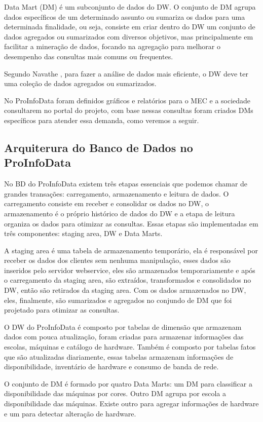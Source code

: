 \documentclass[a4paper,12pt]{article}
\begin{document}
Data Mart (DM) é um subconjunto de dados do DW. O conjunto de DM agrupa dados
específicos de um determinado assunto ou sumariza os dados para uma determinada
finalidade, ou seja, consiste em criar dentro do DW um conjunto de dados
agregados ou sumarizados com diversos objetivos, mas principalmente em
facilitar a mineração de dados, focando na agregação para melhorar o desempenho
das consultas mais comuns ou frequentes.

Segundo Navathe \cite{Navathe}, para fazer a análise de dados mais eficiente,
o DW deve ter uma coleção de dados agregados ou sumarizados. 

No ProInfoData foram definidos gráficos e relatórios para o MEC e a sociedade
consultarem no portal do projeto, com base nessas consultas foram criados DMs
específicos para atender essa demanda, como veremos a seguir.

\subsection{\textbf{Arquiterura do Banco de Dados no ProInfoData}}

No BD do ProInfoData existem três etapas essenciais que podemos chamar de
grandes transações: carregamento, armazenamento e leitura de dados. O
carregamento consiste em receber e consolidar os dados no DW, o armazenamento é
o próprio histórico de dados do DW e a etapa de leitura organiza os dados para
otimizar as consultas. Essas etapas são implementadas em três componentes:
staging area, DW e Data Marts.

A staging area é uma tabela de armazenamento temporário, ela é responsável por
receber os dados dos clientes sem nenhuma manipulação, esses dados são inseridos
pelo servidor webservice, eles são armazenados temporariamente e após o
carregamento da staging area, são extraídos, transformados e consolidados no DW,
então são retirados da staging area. Com os dados armazenados no DW, eles,
finalmente, são sumarizados e agregados no conjundo de DM que foi projetado para
otimizar as consultas.

O DW do ProInfoData é composto por tabelas de dimensão que armazenam dados com
pouca atualização, foram criadas para armazenar informações das escolas, máquinas
e catálogo de hardware. Também é composto por tabelas fatos que são atualizadas
diariamente, essas tabelas armazenam informações de disponibilidade, inventário
de hardware e consumo de banda de rede.

O conjunto de DM é formado por quatro Data Marts: um DM para classificar a
disponibilidade das máquinas por cores. Outro DM agrupa por escola a
disponibilidade das máquinas. Existe outro para agregar informações de hardware
e um para detectar alteração de hardware.
\end{document}
